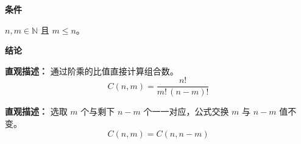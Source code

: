 \begin{statementbox}
	\textbf{\textcolor{CStatement}{条件}}
	\begin{description}[style=nextline, leftmargin=2.8em, labelsep=0.5em, itemsep=0.35em]
		\item[\textbf{\textcolor{CStatement}{条件1（自然数条件）：}}]
			$n,m\in\mathbb{N}$ 且 $m\le n$。
	\end{description}
	\textbf{\textcolor{CStatement}{结论}}
	\begin{description}[style=nextline, leftmargin=2.8em, labelsep=0.5em, itemsep=0.45em]
		\item[\textbf{\textcolor{CStatement}{结论一（阶乘公式）：}}]
			\textbf{\textcolor{CStatement}{直观描述：}}
			通过阶乘的比值直接计算组合数。
			\[
				C(n,m)=\frac{n!}{m!\,(n-m)!}
			\]
		\item[\textbf{\textcolor{CStatement}{推广结论（对称性质）：}}]
			\textbf{\textcolor{CStatement}{直观描述：}}
			选取 $m$ 个与剩下 $n-m$ 个一一对应，公式交换 $m$ 与 $n-m$ 值不变。
			\[
				C(n,m)=C(n,n-m)
			\]
	\end{description}

\end{statementbox}
